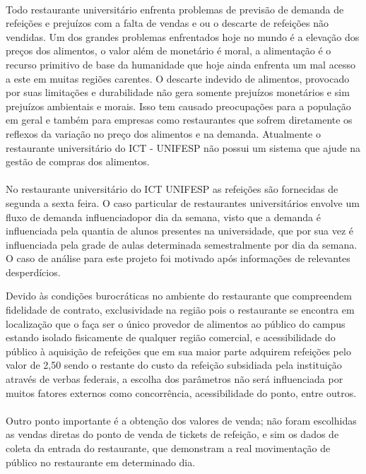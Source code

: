 \documentclass[	12pt, Times, openright, twoside, a4paper, english, brazil]{abntex2}
\begin{document}
        \paragraph*{} Todo restaurante universitário enfrenta problemas de previsão de demanda de refeições e prejuízos com a falta de vendas e ou o descarte de refeições não vendidas. Um dos grandes problemas enfrentados hoje no mundo é a elevação dos preços dos alimentos, o valor além de monetário é moral, a alimentação é o recurso primitivo de base da humanidade que hoje ainda enfrenta um mal acesso a este em muitas regiões carentes. O descarte indevido de alimentos, provocado por suas limitações e durabilidade não gera somente prejuízos monetários e sim prejuízos ambientais e morais. Isso tem causado preocupações para a população em geral e também para empresas como restaurantes que sofrem diretamente os reflexos da variação no preço dos alimentos e na demanda. Atualmente o restaurante universitário do ICT - UNIFESP não possui um sistema que ajude na gestão de compras dos alimentos.

        \paragraph*{} No restaurante universitário do ICT UNIFESP as refeições são fornecidas de segunda a sexta feira. O caso particular de restaurantes universitários envolve um fluxo de demanda influenciadopor dia da semana, visto que a demanda é influenciada pela quantia de alunos presentes na universidade, que por sua vez é influenciada pela grade de aulas determinada semestralmente por dia da semana. O caso de análise para este projeto foi motivado após informações de relevantes desperdícios.

        Devido às condições burocráticas no ambiente do restaurante que compreendem fidelidade de contrato, exclusividade na região pois o restaurante se encontra em localização que o faça ser o único provedor de alimentos ao público do campus estando isolado fisicamente de qualquer região comercial, e acessibilidade do público à aquisição de refeições que em sua maior parte adquirem refeições pelo valor de 2,50 sendo o restante do custo da refeição subsidiada pela instituição através de verbas federais, a escolha dos parâmetros não será influenciada por muitos fatores externos como concorrência, acessibilidade do ponto, entre outros.

        \paragraph*{} Outro ponto importante é a obtenção dos valores de venda; não foram escolhidas as vendas diretas do ponto de venda de tickets de refeição, e sim os dados de coleta da entrada do restaurante, que demonstram a real movimentação de público no restaurante em determinado dia.
\end{document}
